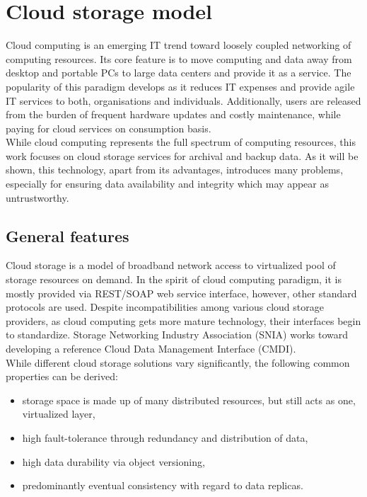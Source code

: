 	\section{Cloud storage model}
	\label{cloud-model}
Cloud computing is an emerging IT trend toward loosely coupled networking of
computing resources. Its core feature is to move computing and data away from
desktop and portable PCs to large data centers and provide it as a service. The
popularity of this paradigm develops as it reduces IT expenses and provide
agile IT services to both, organisations and individuals. Additionally, users
are released from the burden of frequent hardware updates and costly
maintenance, while paying for cloud services on consumption basis.\\

While cloud computing represents the full spectrum of computing resources, this
work focuses on cloud storage services for archival and backup data. As it will
be shown, this technology, apart from its advantages, introduces many problems,
especially for ensuring data availability and integrity which may appear as
untrustworthy.   
		\subsection{General features}
Cloud storage is a model of broadband network access to virtualized pool of
storage resources on demand. In the spirit of cloud computing paradigm, it is 
mostly provided via REST/SOAP web service interface, however, other standard
protocols are used. Despite incompatibilities among various cloud storage
providers, as cloud computing gets more mature technology, their
interfaces begin to standardize. Storage Networking Industry Association (SNIA)
works toward developing a reference Cloud Data Management Interface (CMDI).\\

While different cloud storage solutions vary significantly, the following
common properties can be derived:

\begin{itemize}
	\item storage space is made up of many distributed resources, but still
	acts as one, virtualized layer,
	\item high fault-tolerance through redundancy and distribution of data,
	\item high data durability via object versioning,
	\item predominantly eventual consistency with regard to data replicas.
\end{itemize} 

